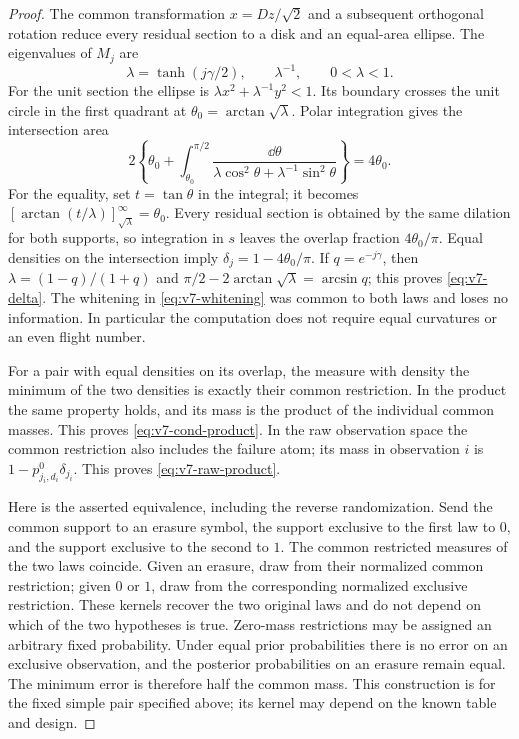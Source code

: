 \begin{proof}
The common transformation $x=Dz/\sqrt2$ and a subsequent orthogonal
rotation reduce every residual section to a disk and an equal-area
ellipse. The eigenvalues of $M_j$ are
\[
 \lambda=\tanh(j\gamma/2),\qquad \lambda^{-1},
 \qquad 0<\lambda<1.
\]
For the unit section the ellipse is
$\lambda x^2+\lambda^{-1}y^2<1$. Its boundary crosses the unit circle
in the first quadrant at $\theta_0=\arctan\sqrt\lambda$.
Polar integration gives the intersection area
\[
 2\left\{\theta_0+\int_{\theta_0}^{\pi/2}
       \frac{\dd\theta}{\lambda\cos^2\theta+
                                    \lambda^{-1}\sin^2\theta}\right\}
   =4\theta_0.
\]
For the equality, set $t=\tan\theta$ in the integral; it becomes
$[\arctan(t/\lambda)]_{\sqrt\lambda}^{\infty}=\theta_0$.
Every residual section is obtained by the same dilation for both
supports, so integration in $s$ leaves the overlap fraction
$4\theta_0/\pi$. Equal densities on the intersection imply
$\delta_j=1-4\theta_0/\pi$.
If $q=e^{-j\gamma}$, then $\lambda=(1-q)/(1+q)$ and
$\pi/2-2\arctan\sqrt\lambda=\arcsin q$; this proves
\eqref{eq:v7-delta}. The whitening in \eqref{eq:v7-whitening} was common
to both laws and loses no information. In particular the computation
does not require equal curvatures or an even flight number.

For a pair with equal densities on its overlap, the measure with
density the minimum of the two densities is exactly their common
restriction. In the product the same property holds, and its mass is
the product of the individual common masses. This proves
\eqref{eq:v7-cond-product}. In the raw observation space the common
restriction also includes the failure atom; its mass in observation
$i$ is $1-p_{j_i,d_i}^0\delta_{j_i}$. This proves
\eqref{eq:v7-raw-product}.

Here is the asserted equivalence, including the reverse randomization.
Send the common support to an erasure symbol, the support exclusive to
the first law to $0$, and the support exclusive to the second to $1$.
The common restricted measures of the two laws coincide. Given an
erasure, draw from their normalized common restriction; given $0$ or
$1$, draw from the corresponding normalized exclusive restriction.
These kernels recover the two original laws and do not depend on which
of the two hypotheses is true. Zero-mass restrictions may be assigned
an arbitrary fixed probability. Under equal prior probabilities there
is no error on an exclusive observation, and the posterior probabilities
on an erasure remain equal. The minimum error is therefore half the
common mass. This construction is for the fixed simple pair specified
above; its kernel may depend on the known table and design.
\end{proof}

